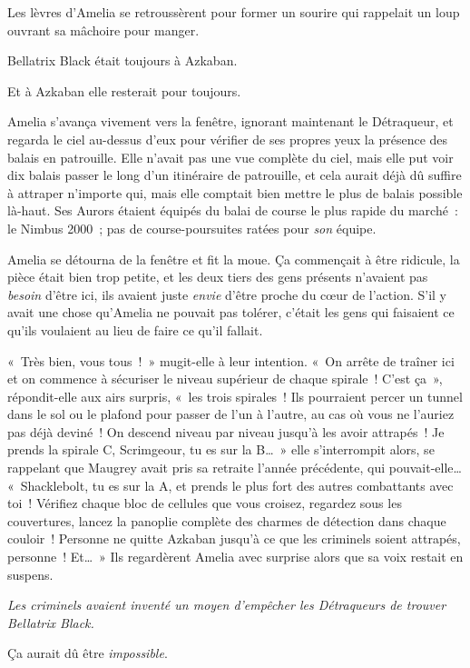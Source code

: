 Les lèvres d'Amelia se retroussèrent pour former un sourire qui rappelait un loup ouvrant sa mâchoire pour manger.

Bellatrix Black était toujours à Azkaban.

Et à Azkaban elle resterait pour toujours.

Amelia s'avança vivement vers la fenêtre, ignorant maintenant le Détraqueur, et regarda le ciel au-dessus d'eux pour vérifier de ses propres yeux la présence des balais en patrouille. Elle n'avait pas une vue complète du ciel, mais elle put voir dix balais passer le long d'un itinéraire de patrouille, et cela aurait déjà dû suffire à attraper n'importe qui, mais elle comptait bien mettre le plus de balais possible là-haut. Ses Aurors étaient équipés du balai de course le plus rapide du marché~: le Nimbus 2000~; pas de course-poursuites ratées pour \emph{son} équipe.

Amelia se détourna de la fenêtre et fit la moue. Ça commençait à être ridicule, la pièce était bien trop petite, et les deux tiers des gens présents n'avaient pas \emph{besoin} d'être ici, ils avaient juste \emph{envie} d'être proche du cœur de l'action. S'il y avait une chose qu'Amelia ne pouvait pas tolérer, c'était les gens qui faisaient ce qu'ils voulaient au lieu de faire ce qu'il fallait.

«~Très bien, vous tous~!~» mugit-elle à leur intention. «~On arrête de traîner ici et on commence à sécuriser le niveau supérieur de chaque spirale~! C'est ça~», répondit-elle aux airs surpris, «~les trois spirales~! Ils pourraient percer un tunnel dans le sol ou le plafond pour passer de l'un à l'autre, au cas où vous ne l'auriez pas déjà deviné~! On descend niveau par niveau jusqu'à les avoir attrapés~! Je prends la spirale C, Scrimgeour, tu es sur la B…~» elle s'interrompit alors, se rappelant que Maugrey avait pris sa retraite l'année précédente, qui pouvait-elle… «~Shacklebolt, tu es sur la A, et prends le plus fort des autres combattants avec toi~! Vérifiez chaque bloc de cellules que vous croisez, regardez sous les couvertures, lancez la panoplie complète des charmes de détection dans chaque couloir~! Personne ne quitte Azkaban jusqu'à ce que les criminels soient attrapés, personne~! Et…~» Ils regardèrent Amelia avec surprise alors que sa voix restait en suspens.

\emph{Les criminels avaient inventé un moyen d'empêcher les Détraqueurs de trouver Bellatrix Black.}

Ça aurait dû être \emph{impossible}.

